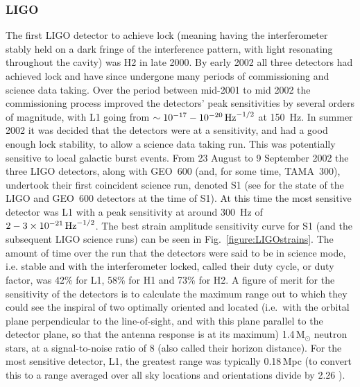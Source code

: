\documentclass{article}
\begin{document}
\subsubsection{LIGO}\label{sec:ligoruns}
The first LIGO detector to achieve lock (meaning having the interferometer stably 
held on a dark fringe of the interference pattern, with light resonating throughout 
the cavity) was H2 in late 2000.
By early 2002 all three detectors had achieved lock and have since
undergone many periods of commissioning and science data taking. Over the period
between mid-2001 to mid 2002 the commissioning process improved the detectors'
peak sensitivities by several orders of magnitude, with L1 going from
$\sim10^{-17}-10^{-20}\,{\rm Hz}^{-1/2}$ at 150~Hz. In summer 2002 it was
decided that the detectors were at a sensitivity, and had a good enough lock
stability, to allow a science data taking run. This was potentially sensitive to
local galactic burst events. From 23 August to 9 September 2002 the three LIGO
detectors, along with GEO~600 (and, for some time, TAMA~300), undertook their
first coincident science run, denoted S1 (see \cite{Abbott:2004a} for the state
of the LIGO and GEO~600 detectors at the time of S1). At this time the most
sensitive detector was L1 with a peak sensitivity at around 300~Hz of
$2-3\times10^{-21}\,{\rm Hz}^{-1/2}$. The best strain amplitude sensitivity
curve for S1 (and the subsequent LIGO science runs) can be seen in
Fig.~\ref{figure:LIGOstrains}. The amount of time over the run that the
detectors were said to be in science mode, i.e. stable and with the
interferometer locked, called their duty cycle, or duty factor, was 42\% for L1,
58\% for H1 and 73\% for H2. A figure of merit for the sensitivity of the
detectors is to calculate the maximum range out to which they could see the
inspiral of two optimally oriented and located (i.e.~with the orbital plane 
perpendicular to the line-of-sight, and with this plane parallel to the detector
plane, so that the antenna response is at its maximum) 1.4\,M$_{\odot}$ neutron stars,
at a signal-to-noise ratio of 8 \cite{Abbott:2005b} (also called their horizon
distance). For the most sensitive detector, L1, the greatest range was typically
0.18\,Mpc (to convert this to a range averaged over all sky locations and
orientations divide by 2.26 \cite{Sutton:2003}).
\end{document}
